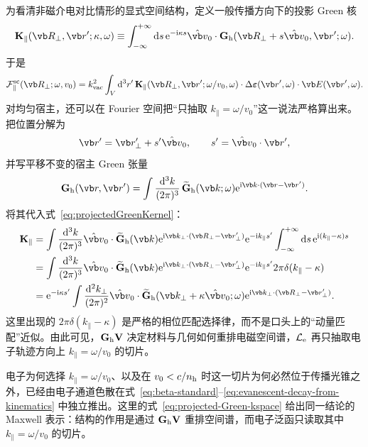 为看清非磁介电对比情形的显式空间结构，定义一般传播方向下的投影 Green 核
\begin{equation}
{
\mathbf K_{\parallel}(\vb R_\perp,\vb r';\kappa,\omega)
\equiv
\int_{-\infty}^{+\infty}\dd s\,
\ee^{-\ii\kappa s}
\hat{\vb v}_0\cdot
\mathbf G_{\rm h}(\vb R_\perp+s\hat{\vb v}_0,\vb r';\omega).}
\label{eq:projectedGreenKernel}
\end{equation}
于是
\begin{equation}
{
\mathcal F_{\parallel}^{\rm sc}(\vb R_\perp;\omega,v_0)
=k_{\rm vac}^2\int_V\dd^3r'\,
\mathbf K_{\parallel}(\vb R_\perp,\vb r';\omega/v_0,\omega)
\cdot\Delta\boldsymbol\varepsilon(\vb r',\omega)
\cdot\vb E(\vb r',\omega).}
\label{eq:general_green_PINEM}
\end{equation}
对均匀宿主，还可以在 Fourier 空间把“只抽取 $k_\parallel=\omega/v_0$”这一说法严格算出来。把位置分解为
\begin{equation}
\vb r'=\vb r'_\perp+s'\hat{\vb v}_0,
\qquad s'=\hat{\vb v}_0\cdot\vb r',
\end{equation}
并写平移不变的宿主 Green 张量
\begin{equation}
\mathbf G_{\rm h}(\vb r,\vb r')
=\int\frac{\dd^3k}{(2\pi)^3}\,
\widetilde{\mathbf G}_{\rm h}(\vb k;\omega)
\ee^{\ii\vb k\cdot(\vb r-\vb r')}.
\end{equation}
将其代入式~\cref{eq:projectedGreenKernel}：
\begin{align}
\mathbf K_\parallel
&=\int\frac{\dd^3k}{(2\pi)^3}
\hat{\vb v}_0\cdot\widetilde{\mathbf G}_{\rm h}(\vb k)
\ee^{\ii\vb k_\perp\cdot(\vb R_\perp-\vb r'_\perp)}
\ee^{-\ii k_\parallel s'}
\int_{-\infty}^{+\infty}\dd s\,
\ee^{\ii(k_\parallel-\kappa)s}\\
&=\int\frac{\dd^3k}{(2\pi)^3}
\hat{\vb v}_0\cdot\widetilde{\mathbf G}_{\rm h}(\vb k)
\ee^{\ii\vb k_\perp\cdot(\vb R_\perp-\vb r'_\perp)}
\ee^{-\ii k_\parallel s'}
2\pi\delta(k_\parallel-\kappa)\\
&=\ee^{-\ii\kappa s'}
\int\frac{\dd^2k_\perp}{(2\pi)^2}
\hat{\vb v}_0\cdot
\widetilde{\mathbf G}_{\rm h}(\vb k_\perp+\kappa\hat{\vb v}_0;\omega)
\ee^{\ii\vb k_\perp\cdot(\vb R_\perp-\vb r'_\perp)}.
\label{eq:projected-Green-kspace}
\end{align}
这里出现的 $2\pi\delta(k_\parallel-\kappa)$ 是严格的相位匹配选择律，而不是口头上的“动量匹配”近似。由此可见，$\mathbf G_{\rm h}\mathbf V$ 决定材料与几何如何重排电磁空间谱，$\mathcal L_{\rm e}$ 再只抽取电子轨迹方向上 $k_{\parallel}=\omega/v_0$ 的切片。


电子为何选择 $k_\parallel=\omega/v_0$、以及在 $v_0<c/n_{\rm h}$ 时这一切片为何必然位于传播光锥之外，已经由电子通道色散在式~\cref{eq:beta-standard}--\cref{eq:evanescent-decay-from-kinematics} 中独立推出。这里的式~\cref{eq:projected-Green-kspace} 给出同一结论的 Maxwell 表示：结构的作用是通过 $\mathbf G_{\rm h}\mathbf V$ 重排空间谱，而电子泛函只读取其中 $k_\parallel=\omega/v_0$ 的切片。

